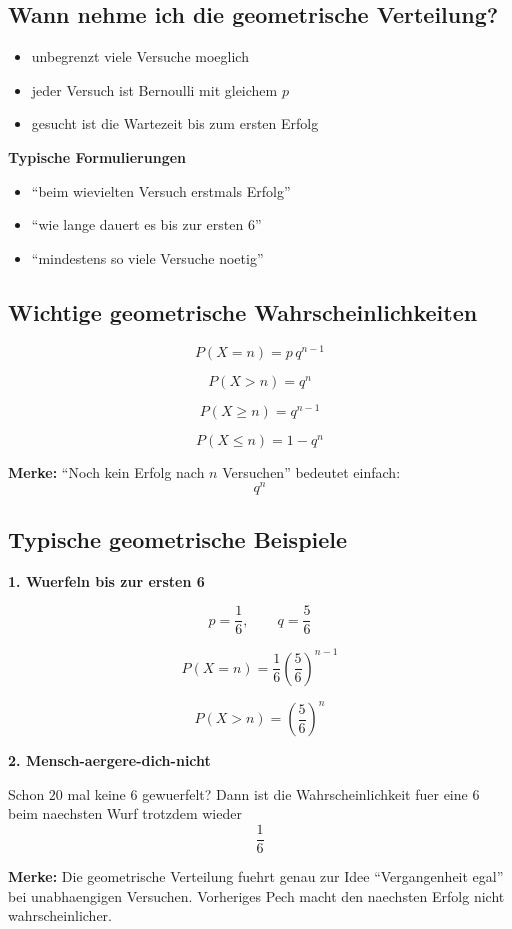\documentclass[a4paper,11pt]{article}
\begin{document}
\subsection{Wann nehme ich die geometrische Verteilung?}
\begin{itemize}
  \item unbegrenzt viele Versuche moeglich
  \item jeder Versuch ist Bernoulli mit gleichem $p$
  \item gesucht ist die Wartezeit bis zum ersten Erfolg
\end{itemize}

\textbf{Typische Formulierungen}
\begin{itemize}
  \item ``beim wievielten Versuch erstmals Erfolg''
  \item ``wie lange dauert es bis zur ersten 6''
  \item ``mindestens so viele Versuche noetig''
\end{itemize}

\subsection{Wichtige geometrische Wahrscheinlichkeiten}
\[
P(X=n)=p\,q^{n-1}
\]

\[
P(X>n)=q^n
\]

\[
P(X\ge n)=q^{n-1}
\]

\[
P(X\le n)=1-q^n
\]

\textbf{Merke:}
``Noch kein Erfolg nach $n$ Versuchen'' bedeutet einfach:
\[
q^n
\]

\subsection{Typische geometrische Beispiele}
\textbf{1. Wuerfeln bis zur ersten 6}

\[
p=\frac16,\qquad q=\frac56
\]

\[
P(X=n)=\frac16\left(\frac56\right)^{n-1}
\]

\[
P(X>n)=\left(\frac56\right)^n
\]

\textbf{2. Mensch-aergere-dich-nicht}

Schon $20$ mal keine $6$ gewuerfelt?
Dann ist die Wahrscheinlichkeit fuer eine $6$ beim naechsten Wurf trotzdem wieder
\[
\frac16
\]

\textbf{Merke:}
Die geometrische Verteilung fuehrt genau zur Idee ``Vergangenheit egal'' bei unabhaengigen Versuchen. Vorheriges Pech macht den naechsten Erfolg nicht wahrscheinlicher.
\end{document}

